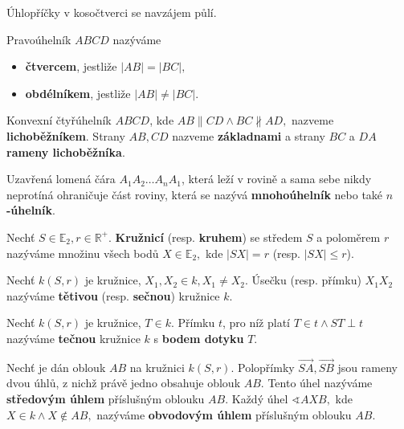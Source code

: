 \begin{veta}
  Úhlopříčky v kosočtverci se navzájem půlí.
\end{veta}

\begin{definition}
  Pravoúhelník $ABCD$ nazýváme
  \begin{itemize}
    \item \textbf{čtvercem}, jestliže $|AB|=|BC|,$
    \item \textbf{obdélníkem}, jestliže $|AB| \ne |BC|$.
  \end{itemize}
\end{definition}

\begin{definition}
  Konvexní čtyřúhelník $ABCD$, kde $AB \parallel CD \land BC \nparallel AD,$ nazveme \textbf{lichoběžníkem}. Strany $AB, CD$ nazveme \textbf{základnami} a strany $BC$ a $DA$ \textbf{rameny lichoběžníka}.
\end{definition}

\begin{definition}
  Uzavřená lomená čára $A_1A_2\dots A_nA_1$, která leží v rovině a sama sebe nikdy neprotíná ohraničuje část roviny, která se nazývá \textbf{mnohoúhelník} nebo také \textbf{$n$-úhelník}.
\end{definition}

\begin{definition}
  Nechť $S \in \mathbb E_2, r \in \mathbb R^+.$  \textbf{Kružnicí} (resp. \textbf{kruhem}) se středem $S$ a poloměrem $r$ nazýváme množinu všech bodů $X\in \mathbb E_2, $ kde $|SX|=r$ (resp. $|SX|\leq r$).
\end{definition}

\begin{definition}
  Nechť $k(S,r)$ je kružnice, $X_1, X_2 \in k, X_1\ne X_2.$ Úsečku (resp. přímku) $X_1X_2$ nazýváme \textbf{tětivou} (resp. \textbf{sečnou}) kružnice $k$.
\end{definition}


\begin{definition}
  Nechť $k(S,r)$ je kružnice, $T\in k$. Přímku $t$, pro níž platí $T\in t \land ST \perp t$ nazýváme \textbf{tečnou} kružnice $k$ s \textbf{bodem dotyku} $T$.
\end{definition}

\begin{definition}
  Nechť je dán oblouk $AB$ na kružnici $k(S,r).$ Polopřímky $\overrightarrow{SA}, \overrightarrow{SB}$ jsou rameny dvou úhlů,
  z nichž právě jedno obsahuje oblouk $AB$. Tento úhel nazýváme \textbf{středovým úhlem} příslušným oblouku $AB$.
  Každý úhel $\sphericalangle AXB,$ kde $X\in k \land X\notin AB,$ nazýváme \textbf{obvodovým úhlem} příslušným oblouku $AB$.
\end{definition}

